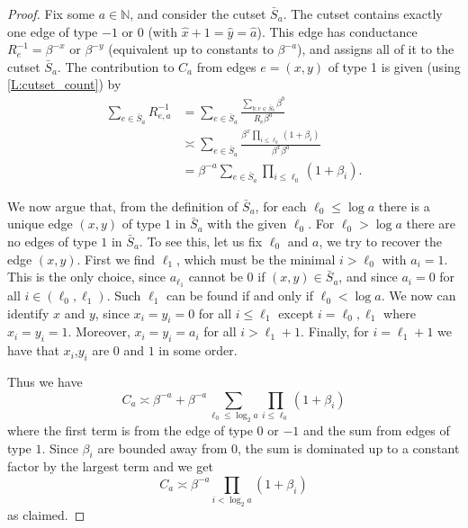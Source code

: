\documentclass[10pt,a4paper]{amsart}
\newcommand{\N}{\mathbb N}
\renewcommand{\hat}{\widehat}
\begin{document}
\begin{proof}
  Fix some $a\in\N$, and consider the cutset $\bar S_a$.
  The cutset contains exactly one edge of type $-1$ or $0$ (with $\hat{x}+1=\hat{y}=\hat{a}$).
  This edge has conductance $R_e^{-1} = \beta^{-x}$ or $\beta^{-y}$ (equivalent up to constants to $\beta^{-a}$), and assigns all of it to the cutset $\bar{S}_a$.
  The contribution to $C_a$ from edges $e=(x,y)$ of type 1 is given (using \cref{L:cutset_count}) by
  \begin{align*}
    \sum_{e\in \bar S_a} R_{e,a}^{-1}
    &= \sum_{e\in \bar S_a}
    \frac{\sum_{b : e\in \bar S_b} \beta^b} {R_e \beta^a} \\
    &\asymp \sum_{e\in \bar S_a}
    \frac{\beta^x \prod_{i\leq\ell_0} (1+\beta_i)} {\beta^x \beta^a} \\
    &= \beta^{-a} \sum_{e\in \bar S_a} \prod_{i\leq\ell_0} (1+\beta_i).
  \end{align*}

  We now argue that, from the definition of $\bar S_a$, for each $\ell_0\leq \log a$ there is a unique edge $(x,y)$ of type $1$ in $\bar S_a$ with the given $\ell_0$.
  For $\ell_0>\log a$ there are no edges of type $1$ in $\bar S_a$.
  To see this, let us fix $\ell_0$ and $a$, we try to recover the edge $(x,y)$.
  First we find $\ell_1$, which must be the minimal  $i>\ell_0$ with $a_i=1$.
  This is the only choice, since $a_{\ell_1}$ cannot be $0$ if $(x,y)\in\bar S_a$, and since $a_i=0$ for all
  $i\in(\ell_0,\ell_1)$.
  Such $\ell_1$ can be found if and only if $\ell_0 < \log a$.
  We now can identify $x$ and $y$, since $x_i=y_i=0$ for all $i\leq \ell_1$ except $i=\ell_0,\ell_1$ where $x_i=y_i=1$.
  Moreover, $x_i=y_i=a_i$ for all $i>\ell_1+1$.
  Finally, for $i=\ell_1+1$ we have that $x_i$,$y_i$ are $0$ and $1$ in some order.

  Thus we have
  \[
    C_a \asymp \beta^{-a} + \beta^{-a} \sum_{\ell_0\leq \log_2 a} \prod_{i\leq \ell_0} (1+\beta_i)
  \]
  where the first term is from the edge of type $0$ or $-1$ and the sum from edges of type $1$.
  Since $\beta_i$ are bounded away from $0$, the sum is dominated up to a constant factor by the largest term and we get
  \[
    C_a \asymp \beta^{-a} \prod_{i < \log_2 a} (1+\beta_i)
  \]
  as claimed.
\end{proof}
\end{document}
